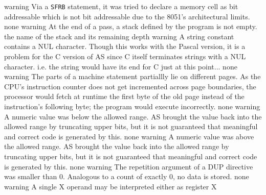 \documentclass[12pt,twoside]{report}
\newcommand{\tty}[1]{{\tt #1}}
\begin{document}
\begin{description}
               {warning}
               {Via a \tty{SFRB} statement, it was tried to declare a memory cell
                as bit addressable which is not bit addressable due to the
                8051's architectural limits.}
               {none}
               {warning}
               {At the end of a pass, a stack defined by the program is
                not empty.}
               {the name of the stack and its remaining depth}
               {warning}
               {A string constant contains a NUL character. Though this
                works with the Pascal version, it is a problem for the
                C version of AS since C itself terminates strings with
                a NUL character. i.e. the string would have its end for
                C just at this point...}
               {none}
               {warning}
               {The parts of a machine statement partiallly lie on
                different pages.  As the CPU's instruction counter does
                not get incremented across page boundaries, the processor
                would fetch at runtime the first byte of the old page
                instead of the instruction's following byte; the program
                would execute incorrectly.}
               {none}
               {warning}
               {A numeric value was below the allowed range.  AS brought
                the value back into the allowed range by truncating upper
                bits, but it is not guaranteed that meaningful and correct
                code is generated by this.}
               {none}
               {warning}
               {A numeric value was above the allowed range.  AS brought
                the value back into the allowed range by truncating upper
                bits, but it is not guaranteed that meaningful and correct
                code is generated by this.}
               {none}
               {warning}
               {The repetition argument of a DUP directive was smaller
                than 0.  Analogous to a count of exactly 0, no data is
                stored.}
               {none}
               {warning}
               {A single X operand may be interpreted either as register X
}
\end{description}
\end{document}

